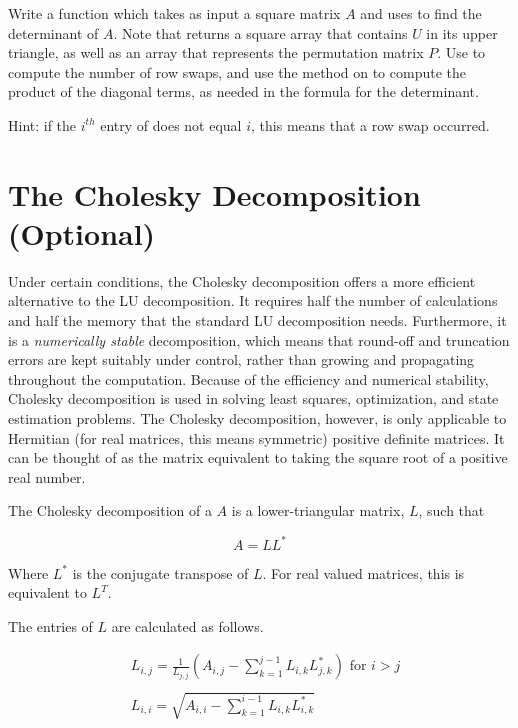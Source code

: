 \begin{problem}
\label{prob:det}
Write a function which takes as input a square matrix $A$ and uses  to find the determinant of $A$. Note that  returns a square array  that contains $U$ in its upper triangle, as well as an array  that represents the 
permutation matrix $P$. Use  to compute the number of row swaps, and use the  method on  to compute the product of the diagonal terms, as needed in the formula for the determinant.

Hint: if the $i^{th}$ entry of  does not equal $i$, this means that a row swap occurred.
\end{problem}

\section*{The Cholesky Decomposition (Optional)}

Under certain conditions, the Cholesky decomposition offers a more efficient alternative to the LU decomposition.
It requires half the number of calculations and half the memory that the standard LU decomposition needs.
Furthermore, it is a \emph{numerically stable} decomposition, which means that round-off and truncation errors are kept suitably under control, rather than growing and propagating throughout the computation.
Because of the efficiency and numerical stability, Cholesky decomposition is used in solving least squares, optimization, and state estimation problems.
The Cholesky decomposition, however, is only applicable to Hermitian (for real matrices, this means symmetric) positive definite matrices.
It can be thought of as the matrix equivalent to taking the square root of a positive real number.

The Cholesky decomposition of a $A$ is a lower-triangular matrix, $L$, such that

\begin{equation*}
 A = LL^*
\end{equation*}

Where $L^*$ is the conjugate transpose of $L$.
For real valued matrices, this is equivalent to $L^T$.

The entries of $L$ are calculated as follows.

\begin{align*}
&L_{i,j} = \frac{1}{L_{j,j}}\left(A_{i,j} -\sum_{k=1}^{j-1}{L_{i,k}L_{j,k}^*}\right) \mbox{ for $i>j$} \\ \\
&L_{i,i} = \sqrt{A_{i,i} - \sum_{k=1}^{i-1}{L_{i,k}L_{i,k}^*}}
\end{align*}

